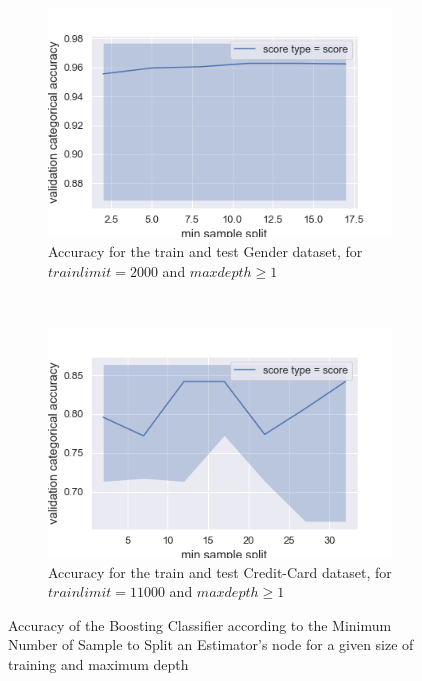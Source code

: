 \documentclass[10pt]{article}
\begin{document}
			\begin{figure}[h]
				\centering
				\begin{subfigure}[]{0.45\columnwidth}
					\centering
					\includegraphics[width=\linewidth]{../graphics/boost_gender_min_sample_split_score_type_score_type.png}
					\caption{Accuracy for the train and test Gender dataset, for $trainlimit=2000$ and $maxdepth\ge1$}
					\label{boost:g_train_vs_test_ms}
				\end{subfigure}
				~
				\begin{subfigure}[]{0.45\columnwidth}
					\centering
					\includegraphics[width=\linewidth]{../graphics/boost_creditcard_min_sample_split_score_type_score_type.png}
					\caption{Accuracy for the train and test Credit-Card dataset, for $trainlimit=11000$ and $maxdepth\geq1$}
					\label{boost:cc_train_vs_test_ms}
				\end{subfigure}
				\caption{Accuracy of the Boosting Classifier according to the Minimum Number of Sample to Split an Estimator's node for a given size of training and maximum depth}
				\label{boost:train_vs_test_ms}
			\end{figure}
\end{document}
